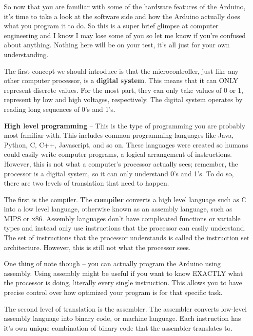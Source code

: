 \documentclass[10pt]{report}
\begin{document}
\par 
So now that you are familiar with some of the hardware features of the Arduino, it’s time to take a look at the software side and how the Arduino actually does what you program it to do. So this is a super brief glimpse at computer engineering and I know I may lose some of you so let me know if you’re confused about anything. Nothing here will be on your test, it’s all just for your own understanding.
\par
The first concept we should introduce is that the microcontroller, just like any other computer processor, is a \textbf{digital system}. This means that it can ONLY represent discrete values. For the most part, they can only take values of 0 or 1, represent by low and high voltages, respectively. The digital system operates by reading long sequences of 0’s and 1’s.
\par 
\textbf{High level programming} – This is the type of programming you are probably most familiar with. This includes common programming languages like Java, Python, C, C++, Javascript, and so on. These languages were created so humans could easily write computer programs, a logical arrangement of instructions. However, this is not what a computer’s processor actually sees; remember, the processor is a digital system, so it can only understand 0’s and 1’s. To do so, there are two levels of translation that need to happen.
\par
The first is the compiler. The \textbf{compiler} converts a high level language such as C into a low level language, otherwise known as an assembly language, such as MIPS or x86. Assembly languages don’t have complicated functions or variable types and instead only use instructions that the processor can easily understand. The set of instructions that the processor understands is called the instruction set architecture. However, this is still not what the processor sees.
\par
One thing of note though – you can actually program the Arduino using assembly. Using assembly might be useful if you want to know EXACTLY what the processor is doing, literally every single instruction. This allows you to have precise control over how optimized your program is for that specific task.
\par
The second level of translation is the assembler. The assembler converts low-level assembly language into binary code, or machine language. Each instruction has it’s own unique combination of binary code that the assembler translates to.
\par
\end{document}
